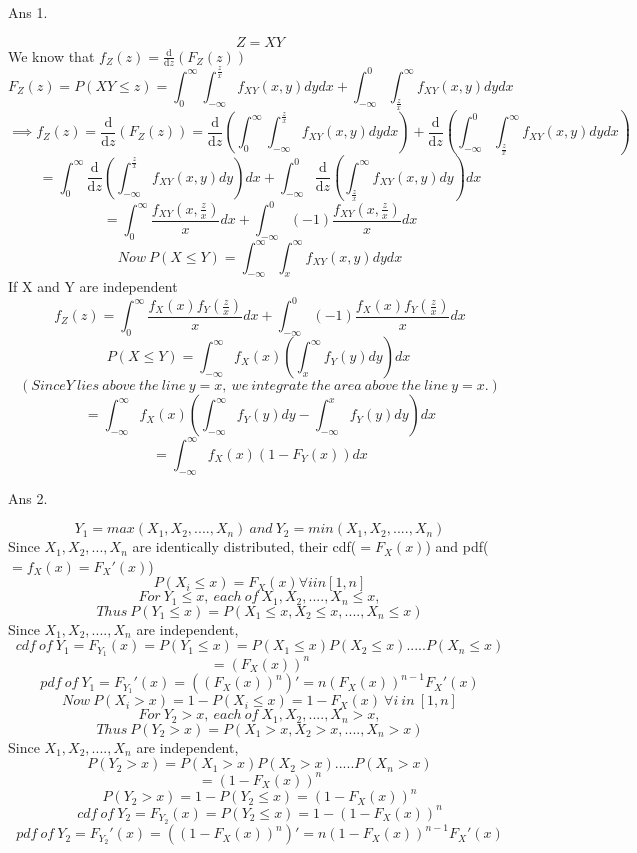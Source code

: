 \documentclass[11pt]{article}
\begin{document}
\maketitle

Ans 1.\begin{center}
$$Z=XY$$
We know that $f_Z(z) = \frac{\text{d}}{\text{d}z}(F_Z(z))$
$$F_Z(z) =P(XY \le z)= \int_{0}^{\infty}\int_{-\infty}^{\frac{z}{x}}f_{XY}(x,y)dydx + \int_{-\infty}^{0}\int_{\frac{z}{x}}^{\infty}f_{XY}(x,y)dydx$$
$$\implies f_Z(z)=\frac{\text{d}}{\text{d}z}(F_Z(z))=\frac{\text{d}}{\text{d}z}(\int_{0}^{\infty}\int_{-\infty}^{\frac{z}{x}}f_{XY}(x,y)dydx)+\frac{\text{d}}{\text{d}z}(\int_{-\infty}^{0}\int_{\frac{z}{x}}^{\infty}f_{XY}(x,y)dydx)$$
$$=\int_{0}^{\infty}\frac{\text{d}}{\text{d}z}(\int_{-\infty}^{\frac{z}{x}}f_{XY}(x,y)dy)dx+\int_{-\infty}^{0}\frac{\text{d}}{\text{d}z}(\int_{\frac{z}{x}}^{\infty}f_{XY}(x,y)dy)dx$$
$$=\int_{0}^{\infty}\frac{f_{XY}(x,\frac{z}{x})}{x}dx + \int_{-\infty}^{0}(-1)\frac{f_{XY}(x,\frac{z}{x})}{x}dx$$
$$Now\ P(X \le Y) = \int_{-\infty}^{\infty}\int_{x}^{\infty}f_{XY}(x,y)dydx$$
If X and Y are independent
$$f_Z(z) = \int_{0}^{\infty}\frac{f_{X}(x)f_Y(\frac{z}{x})}{x}dx + \int_{-\infty}^{0}(-1)\frac{f_{X}(x)f_Y(\frac{z}{x})}{x}dx$$
$$P(X \le Y) = \int_{-\infty}^{\infty}f_X(x)(\int_{x}^{\infty}f_Y(y)dy)dx\ $$
$$(Since  Y\ lies\ above\ the\ line\ y=x,\ we\ integrate\ the\ area\ above\ the\ line\ y=x.)$$
$$=\int_{-\infty}^{\infty}f_X(x)(\int_{-\infty}^{\infty}f_Y(y)dy-\int_{-\infty}^{x}f_Y(y)dy)dx$$
$$=\int_{-\infty}^{\infty}f_X(x)(1-F_Y(x))dx$$
\newline
\newline
\end{center}

\pagebreak
Ans 2.\begin{center}
$$Y_1=max(X_1,X_2,....,X_n)\ and\ Y_2=min(X_1,X_2,....,X_n)$$
Since $X_1,X_2,...,X_n$ are identically distributed, their cdf($=F_X(x)$) and pdf($=f_X(x) = F_X'(x)$)
$$P(X_i \le x) = F_X(x) \forall i in [1,n]$$
$$For\ Y_1 \le x,\ each\ of\ X_1,X_2,....,X_n \le x,$$
$$Thus\ P(Y_1\le x) = P(X_1\le x,X_2\le x,....,X_n \le x)$$
Since $X_1,X_2,....,X_n$ are independent,
$$cdf\ of\ Y_1 = F_{Y_1}(x) = P(Y_1 \le x) = P(X_1 \le x)P(X_2 \le x).....P(X_n \le x)$$
$$=(F_X(x))^n$$
$$pdf\ of\ Y_1 = F_{Y_1}'(x) = ((F_X(x))^n)' = n(F_X(x))^{n-1}F_X'(x)$$
\linebreak
$$Now\ P(X_i > x) = 1 - P(X_i \le x) = 1 - F_X(x)\ \forall i\ in\ [1,n]$$
$$For\ Y_2 > x,\ each\ of\ X_1,X_2,....,X_n > x,$$
$$Thus\ P(Y_2 > x) = P(X_1> x,X_2> x,....,X_n > x)$$
Since $X_1,X_2,....,X_n$ are independent,
$$P(Y_2 > x) = P(X_1 > x)P(X_2 > x).....P(X_n > x)$$
$$=(1 - F_X(x))^n$$
$$P(Y_2 > x) = 1 - P(Y_2 \le x) =(1 - F_X(x))^n$$
$$cdf\ of\ Y_2 = F_{Y_2}(x)=P(Y_2 \le x) = 1 - (1 - F_X(x))^n$$
$$pdf\ of\ Y_2 = F_{Y_2}'(x) = ((1 - F_X(x))^n)' = n(1 - F_X(x))^{n-1}F_X'(x)$$
\newline
\newline
\end{center}
\end{document}
